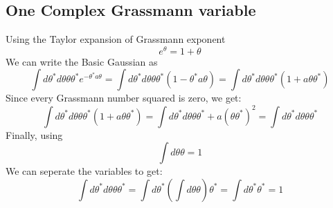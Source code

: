 \documentclass{article}
\begin{document}
\subsection{One Complex Grassmann variable}
Using the Taylor expansion of Grassmann exponent
\begin{equation}
    e^{\theta} = 1 + \theta
\end{equation}
We can write the Basic Gaussian as
\begin{equation}
    \int d\theta^* d\theta \theta \theta^*e^{-\theta^* a \theta} = \int d\theta^* d\theta \theta \theta^*(1 - \theta^* a \theta) = \int d\theta^* d\theta \theta \theta^*(1 + a \theta \theta^*)
\end{equation}
Since every Grassmann number squared is zero, we get:
\begin{equation}
    \int d\theta^* d\theta \theta \theta^*(1 + a \theta \theta^*) =
    \int d\theta^* d\theta \theta \theta^* + a \left(\theta \theta^*\right)^2 = 
    \int d\theta^* d\theta \theta \theta^* 
\end{equation}
Finally, using
\begin{equation}
    \int d\theta \theta = 1
\end{equation}
We can seperate the variables to get:
\begin{equation}
    \int d\theta^* d\theta \theta \theta^* =
    \int d\theta^* \left(\int d\theta \theta\right) \theta^* = \int d\theta^* \theta^* = 1
\end{equation}
\end{document}
